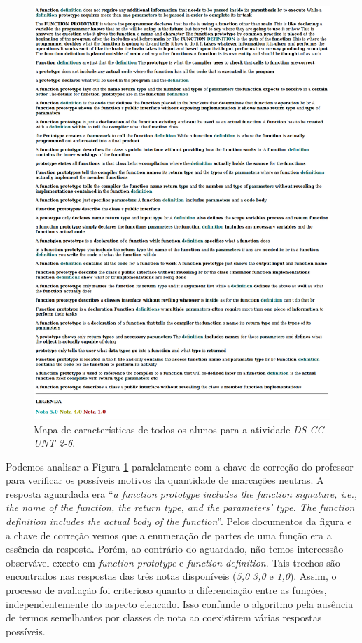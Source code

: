 \begin{figure}[h!]
\centering
\includegraphics[width=\textwidth]{img/UNT-2-6.png}
\caption{Mapa de características de todos os alunos para a atividade \textit{DS CC UNT 2-6}.}
\label{UNT-26}
\end{figure}

Podemos analisar a Figura \ref{UNT-26} paralelamente com a chave de correção do professor para verificar os possíveis motivos da quantidade de marcações neutras. A resposta aguardada era ``\textit{a function prototype includes the function signature, i.e., the name of the function, the return type, and the parameters' type. The function definition includes the actual body of the function}''. Pelos documentos da figura e a chave de correção vemos que a enumeração de partes de uma função era a essência da resposta. Porém, ao contrário do aguardado, não temos intercessão observável exceto em \textit{function prototype} e \textit{function definition}. Tais trechos são encontrados nas respostas das três notas disponíveis (\textit{5,0 3,0} e \textit{1,0}). Assim, o processo de avaliação foi criterioso quanto a diferenciação entre as funções, independentemente do aspecto elencado. Isso confunde o algoritmo pela ausência de termos semelhantes por classes de nota ao coexistirem várias respostas possíveis.

